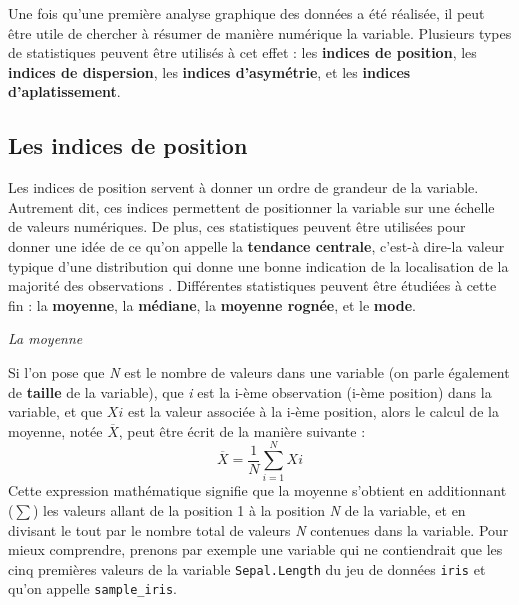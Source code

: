 \documentclass[
  french,
]{book}
\newenvironment{Shaded}{\begin{snugshade}}{\end{snugshade}}
\newcommand{\DecValTok}[1]{\textcolor[rgb]{0.00,0.00,0.81}{#1}}
\newcommand{\NormalTok}[1]{#1}
\newcommand{\OperatorTok}[1]{\textcolor[rgb]{0.81,0.36,0.00}{\textbf{#1}}}
\newcommand{\StringTok}[1]{\textcolor[rgb]{0.31,0.60,0.02}{#1}}
\begin{document}
Une fois qu'une première analyse graphique des données a été réalisée, il peut être utile de chercher à résumer de manière numérique la variable. Plusieurs types de statistiques peuvent être utilisés à cet effet : les \textbf{indices de position}, les \textbf{indices de dispersion}, les \textbf{indices d'asymétrie}, et les \textbf{indices d'aplatissement}.

\hypertarget{les-indices-de-position}{%
\subsection{Les indices de position}\label{les-indices-de-position}}

Les indices de position servent à donner un ordre de grandeur de la variable. Autrement dit, ces indices permettent de positionner la variable sur une échelle de valeurs numériques. De plus, ces statistiques peuvent être utilisées pour donner une idée de ce qu'on appelle la \textbf{tendance centrale}, c'est-à dire-la valeur typique d'une distribution qui donne une bonne indication de la localisation de la majorité des observations \autocite{rousseletReactionTimesOther2020}. Différentes statistiques peuvent être étudiées à cette fin : la \textbf{moyenne}, la \textbf{médiane}, la \textbf{moyenne rognée}, et le \textbf{mode}.

\emph{La moyenne}

Si l'on pose que \emph{N} est le nombre de valeurs dans une variable (on parle également de \textbf{taille} de la variable), que \emph{i} est la i-ème observation (i-ème position) dans la variable, et que \(X{i}\) est la valeur associée à la i-ème position, alors le calcul de la moyenne, notée \(\overline{X}\), peut être écrit de la manière suivante :
\[\overline{X} = \frac{1}{N}\sum_{i=1}^{N} X{i}\]
Cette expression mathématique signifie que la moyenne s'obtient en additionnant (\(\sum\)) les valeurs allant de la position 1 à la position \emph{N} de la variable, et en divisant le tout par le nombre total de valeurs \emph{N} contenues dans la variable. Pour mieux comprendre, prenons par exemple une variable qui ne contiendrait que les cinq premières valeurs de la variable \texttt{Sepal.Length} du jeu de données \texttt{iris} et qu'on appelle \texttt{sample\_iris}.

\begin{Shaded}
\end{Shaded}
\end{document}
